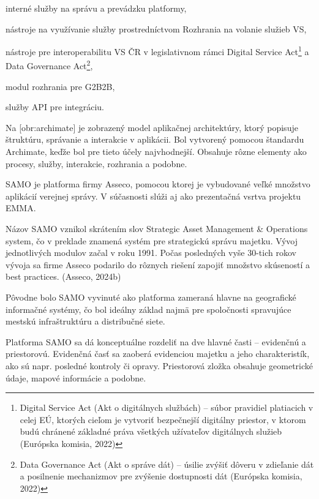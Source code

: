 \startitemize
\item{interné služby na správu a prevádzku platformy,}
\item{nástroje na využívanie služby prostredníctvom Rozhrania na volanie služieb VS,}
\item{nástroje pre interoperabilitu VS ČR v legislativnom rámci Digital Service Act\footnote{Digital Service Act (Akt o digitálnych službách) -- súbor pravidiel platiacich v celej EÚ, ktorých cieľom je vytvoriť bezpečnejší digitálny priestor, v ktorom budú chránené základné práva všetkých užívateľov digitálnych služieb \scr(Európska komisia, 2022)} a Data Governance Act\footnote{Data Governance Act (Akt o správe dát) -- úsilie zvýšiť dôveru v zdieľanie dát a posilnenie mechanizmov pre zvýšenie dostupnosti dát \scr(Európska komisia, 2022)},}
\item{modul rozhrania pre G2B2B,}
\item{služby API pre integráciu.}
\stopitemize 


Na [obr:archimate] je zobrazený model aplikačnej architektúry, ktorý popisuje štruktúru, správanie a interakcie v aplikácii. Bol vytvorený pomocou štandardu Archimate, keďže bol pre tieto účely najvhodnejší. Obsahuje rôzne elementy ako procesy, služby, interakcie, rozhrania a podobne.



SAMO je platforma firmy Asseco, pomocou ktorej je vybudované veľké množstvo aplikácií verejnej správy. V súčasnosti slúži aj ako prezentačná vsrtva projektu EMMA.

Názov SAMO vznikol skrátením slov Strategic Asset Management \& Operations system, čo v preklade znamená systém pre strategickú správu majetku. Vývoj jednotlivých modulov začal v roku 1991. Počas posledných vyše 30-tich rokov vývoja sa firme Asseco podarilo do rôznych riešení zapojiť množstvo skúseností a best practices. \scr(Asseco, 2024b)

Pôvodne bolo SAMO vyvinuté ako platforma zameraná hlavne na geografické informačné systémy, čo bol ideálny základ najmä pre spoločnosti spravujúce mestskú infraštruktúru a distribučné siete.

Platforma SAMO sa dá konceptuálne rozdeliť na dve hlavné časti – evidenčnú a priestorovú. Evidenčná časť sa zaoberá evidenciou majetku a jeho charakteristík, ako sú napr. posledné kontroly či opravy. Priestorová zložka obsahuje geometrické údaje, mapové informácie a podobne.

